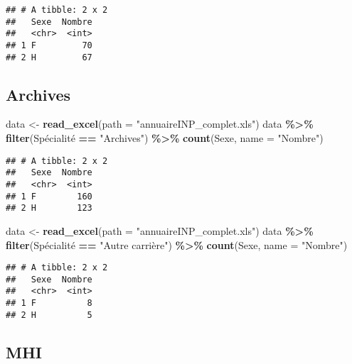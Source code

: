 \documentclass[
]{article}
\newenvironment{Shaded}{\begin{snugshade}}{\end{snugshade}}
\newcommand{\DataTypeTok}[1]{\textcolor[rgb]{0.13,0.29,0.53}{#1}}
\newcommand{\KeywordTok}[1]{\textcolor[rgb]{0.13,0.29,0.53}{\textbf{#1}}}
\newcommand{\NormalTok}[1]{#1}
\newcommand{\OperatorTok}[1]{\textcolor[rgb]{0.81,0.36,0.00}{\textbf{#1}}}
\newcommand{\StringTok}[1]{\textcolor[rgb]{0.31,0.60,0.02}{#1}}
\begin{document}
\begin{verbatim}
## # A tibble: 2 x 2
##   Sexe  Nombre
##   <chr>  <int>
## 1 F         70
## 2 H         67
\end{verbatim}

\hypertarget{archives}{%
\subsection{Archives}\label{archives}}

\begin{Shaded}
\begin{Highlighting}[]
\NormalTok{data \textless{}{-}}\StringTok{ }\KeywordTok{read\_excel}\NormalTok{(}\DataTypeTok{path =} \StringTok{"annuaireINP\_complet.xls"}\NormalTok{)}
\NormalTok{data }\OperatorTok{\%\textgreater{}\%}
\StringTok{  }\KeywordTok{filter}\NormalTok{(Spécialité }\OperatorTok{==}\StringTok{ "Archives"}\NormalTok{) }\OperatorTok{\%\textgreater{}\%}\StringTok{ }
\StringTok{  }\KeywordTok{count}\NormalTok{(Sexe, }\DataTypeTok{name =} \StringTok{"Nombre"}\NormalTok{)}
\end{Highlighting}
\end{Shaded}

\begin{verbatim}
## # A tibble: 2 x 2
##   Sexe  Nombre
##   <chr>  <int>
## 1 F        160
## 2 H        123
\end{verbatim}

\begin{Shaded}
\begin{Highlighting}[]
\NormalTok{data \textless{}{-}}\StringTok{ }\KeywordTok{read\_excel}\NormalTok{(}\DataTypeTok{path =} \StringTok{"annuaireINP\_complet.xls"}\NormalTok{)}
\NormalTok{data }\OperatorTok{\%\textgreater{}\%}
\StringTok{  }\KeywordTok{filter}\NormalTok{(Spécialité }\OperatorTok{==}\StringTok{ "Autre carrière"}\NormalTok{) }\OperatorTok{\%\textgreater{}\%}\StringTok{ }
\StringTok{  }\KeywordTok{count}\NormalTok{(Sexe, }\DataTypeTok{name =} \StringTok{"Nombre"}\NormalTok{)}
\end{Highlighting}
\end{Shaded}

\begin{verbatim}
## # A tibble: 2 x 2
##   Sexe  Nombre
##   <chr>  <int>
## 1 F          8
## 2 H          5
\end{verbatim}

\hypertarget{mhi}{%
\subsection{MHI}\label{mhi}}
\end{document}
